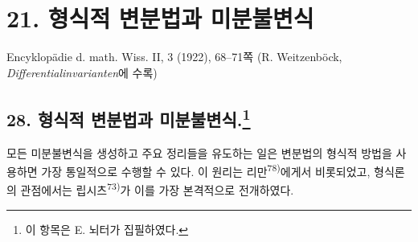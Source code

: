 
\section*{21. 형식적 변분법과 미분불변식}
\begin{center}
Encyklopädie d. math. Wiss. II, 3 (1922), 68--71쪽
(R. Weitzenböck, \emph{Differentialinvarianten}에 수록)
\end{center}

\begingroup
\renewcommand{\thefootnote}{\arabic{footnote})}
\setcounter{footnote}{148}
\subsection*{28. 형식적 변분법과 미분불변식.\footnote{이 항목은 E. 뇌터가 집필하였다.}}

모든 미분불변식을 생성하고 주요 정리들을 유도하는 일은 변분법의 형식적 방법을 사용하면 가장 통일적으로 수행할 수 있다. 이 원리는 리만\textsuperscript{78)}에게서 비롯되었고, 형식론의 관점에서는 립시츠\textsuperscript{73)}가 이를 가장 본격적으로 전개하였다.

